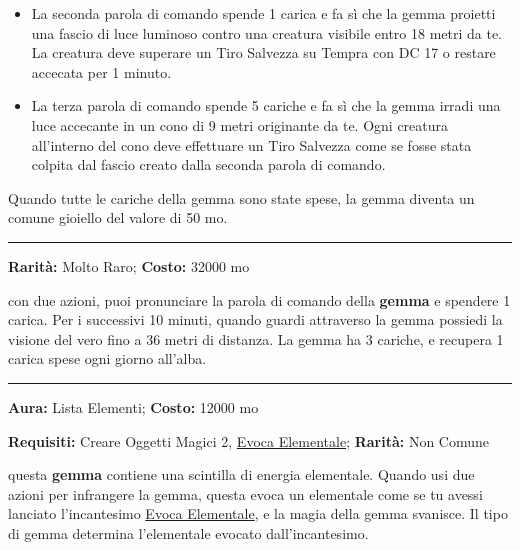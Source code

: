 \begin{multicols}{2}
\begin{itemize}[leftmargin=*]
\item
La seconda parola di comando spende 1 carica e fa sì che la gemma proietti una fascio di luce luminoso contro una creatura visibile entro 18 metri da te. La creatura deve superare un Tiro Salvezza su Tempra con DC 17 o restare accecata per 1 minuto.

\item
La terza parola di comando spende 5 cariche e fa sì che la gemma irradi una luce accecante in un cono di 9 metri originante da te. Ogni creatura all'interno del cono deve effettuare un Tiro Salvezza come se fosse stata colpita dal fascio creato dalla seconda parola di comando.

\end{itemize}

\medskip

Quando tutte le cariche della gemma sono state spese, la gemma diventa un comune gioiello del valore di 50 mo.

\smallskip\noindent\rule{\linewidth}{2pt}  \hypertarget{GemmadellaVista}{}\medskip{}\noindent\label{GemmadellaVista}

\textbf{Rarità:} Molto Raro; \textbf{Costo:} 32000 mo

con due azioni, puoi pronunciare la parola di comando della \textbf{gemma} e spendere 1 carica. Per i successivi 10 minuti, quando guardi attraverso la gemma possiedi la visione del vero fino a 36 metri di distanza. La gemma ha 3 cariche, e recupera 1 carica spese ogni giorno all'alba.

\smallskip\noindent\rule{\linewidth}{2pt}  \hypertarget{GemmaElementale}{}\medskip{}\noindent\label{GemmaElementale}

\textbf{Aura:} Lista Elementi; \textbf{Costo:} 12000 mo

\textbf{Requisiti:} Creare Oggetti Magici 2, \hyperlink{Evoca Elementale}{Evoca Elementale}; \textbf{Rarità:} Non Comune

questa \textbf{gemma} contiene una scintilla di energia elementale. Quando usi due azioni per infrangere la gemma, questa evoca un elementale come se tu avessi lanciato l'incantesimo \hyperlink{Evoca Elementale}{Evoca Elementale}, e la magia della gemma svanisce. Il tipo di gemma determina l'elementale evocato dall'incantesimo.


\end{multicols}
